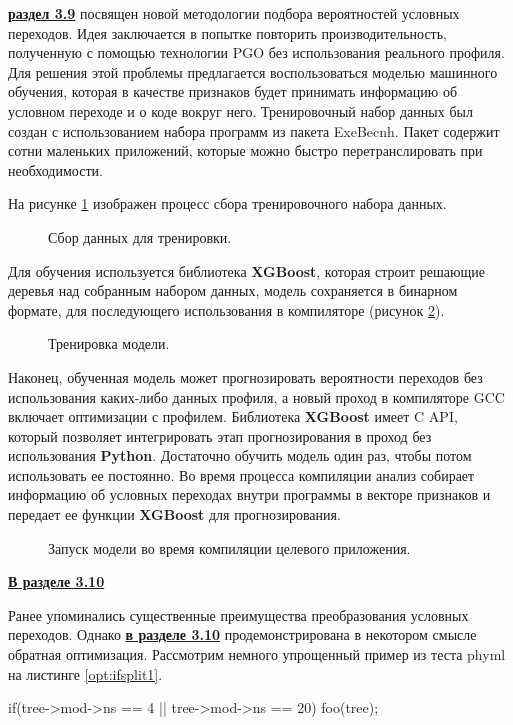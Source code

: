   \underline{\textbf{раздел 3.9}} посвящен новой методологии подбора вероятностей условных переходов. Идея заключается в попытке повторить производительность, полученную с помощью технологии PGO без использования реального профиля. Для решения этой проблемы предлагается воспользоваться моделью машинного обучения, которая в качестве признаков будет принимать информацию об условном переходе и о коде вокруг него. Тренировочный набор данных был создан с использованием набора программ из пакета
  ExeBecnh. Пакет содержит сотни маленьких приложений, которые
  можно быстро перетранслировать при необходимости. 
  
  На рисунке \ref{op:mlpgo1} изображен процесс сбора тренировочного набора данных.
  \begin{figure}[htbp]
  	\centering
  	
  	\caption{Сбор данных для тренировки.}
  	\label{op:mlpgo1}
  \end{figure}
  
  Для обучения используется библиотека \textbf{XGBoost}, которая строит решающие деревья над собранным набором данных, модель сохраняется в бинарном формате, для последующего использования в компиляторе (рисунок \ref{op:mlpgo2}).
  
  \begin{figure}[htbp]
  	\centering
  	
  	\caption{Тренировка модели.}
  	\label{op:mlpgo2}
  \end{figure}
  Наконец, обученная модель может прогнозировать вероятности  переходов  без использования каких-либо данных профиля, а новый проход в компиляторе GCC включает оптимизации с профилем. Библиотека \textbf{XGBoost} имеет C API, который позволяет интегрировать этап прогнозирования в проход без использования \textbf{Python}. Достаточно обучить модель один раз, чтобы потом использовать ее постоянно. Во время процесса компиляции  анализ собирает информацию об условных переходах  внутри программы в векторе признаков и передает ее функции \textbf{XGBoost} для прогнозирования.
  \begin{figure}[htbp]
  	\centering
  	
  	\caption{Запуск модели во время компиляции целевого приложения.}
  	\label{op:mlpgo3}
  \end{figure}
 	
  \underline{\textbf{В разделе 3.10}}
  
  Ранее упоминались существенные преимущества преобразования условных переходов. Однако \underline{\textbf{в разделе 3.10}} продемонстрирована в некотором смысле обратная оптимизация. Рассмотрим немного упрощенный пример из теста phyml на листинге \ref{opt:ifsplit1}.
  \begin{ListingEnv}[!h]
  	\captiondelim{ } %
  	\caption{Пример кандидата для оптимизации разбиения условных выражений из теста phyml.}\label{opt:ifsplit1}
  	\begin{Verb}
  		if(tree->mod->ns == 4 || tree->mod->ns == 20) {	
  			foo(tree);
  		}
  	\end{Verb}
  \end{ListingEnv}
  
